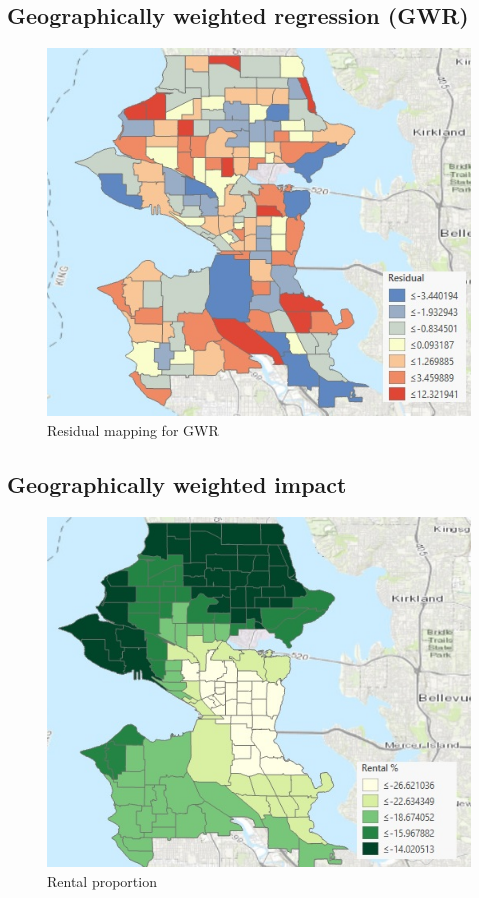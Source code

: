 \documentclass[]{article}
\begin{document}
\subsection{Geographically weighted regression
(GWR)}\label{geographically-weighted-regression-gwr}

\begin{figure}
\centering
\includegraphics{./Figs/Residual-GWR.jpg}
\caption{Residual mapping for GWR}
\end{figure}

\subsection{Geographically weighted
impact}\label{geographically-weighted-impact}

\begin{figure}
\centering
\includegraphics{./Figs/Rental-w.jpg}
\caption{Rental proportion}
\end{figure}
\end{document}
